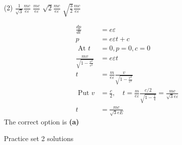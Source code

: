 \begin{enumerate}
\begin{tasks}(2)
	\task[\textbf{A.}] $\frac{1}{\sqrt{3}} \frac{m c}{e \varepsilon}$
	\task[\textbf{B.}]$\frac{m c}{e \varepsilon}$
	\task[\textbf{C.}]$\sqrt{2} \frac{m c}{e \varepsilon}$
	\task[\textbf{D.}]$\sqrt{\frac{3}{2}} \frac{m c}{e \varepsilon}$
\end{tasks}
\begin{answer}
\begin{align*}
\frac{d p}{d t}&=e \varepsilon\\
p&=e \varepsilon t+c\\
\text { At } t&=0, p=0, c=0\\
\frac{m v}{\sqrt{1-\frac{v^{2}}{c^{2}}}}&=e \varepsilon t\\
t&=\frac{m}{e \varepsilon} \frac{v}{\sqrt{1-\frac{v^{2}}{c^{2}}}}\\
\text { Put } v&=\frac{c}{2}, \quad t=\frac{m}{e \varepsilon} \frac{c / 2}{\sqrt{1-\frac{1}{4}}}=\frac{m c}{\sqrt{3} e \varepsilon}\\
t&=\frac{m c}{\sqrt{3} e E}
\end{align*}
The correct option is \textbf{(a)}	
\end{answer}
\end{enumerate}
\newpage
\begin{abox}
	Practice set 2 solutions
	\end{abox}
